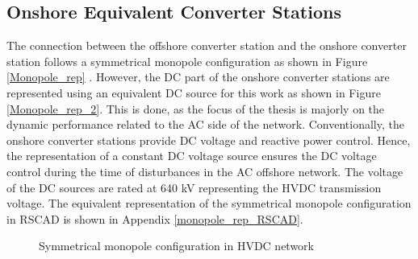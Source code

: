 \subsection{Onshore Equivalent Converter Stations}
The connection between the offshore converter station and the onshore converter station follows a symmetrical monopole configuration as shown in Figure \ref{Monopole_rep} \cite{sharifabadi2016design}. However, the \gls{DC} part of the onshore converter stations are represented using an equivalent \gls{DC} source for this work as shown in Figure \ref{Monopole_rep_2}. This is done, as the focus of the thesis is majorly on the dynamic performance related to the \gls{AC} side of the network. Conventionally, the onshore converter stations provide \gls{DC} voltage and reactive power control. Hence, the representation of a constant \gls{DC} voltage source ensures the \gls{DC} voltage control during the time of disturbances in the \gls{AC} offshore network. The voltage of the \gls{DC} sources are rated at 640 kV representing the \gls{HVDC} transmission voltage. The equivalent representation of the symmetrical monopole configuration in RSCAD is shown in Appendix \ref{monopole_rep_RSCAD}.  

\begin{figure}[H]
\centering





\caption{Symmetrical monopole configuration in HVDC network}

\end{figure}



